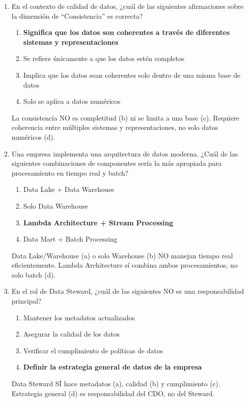 \documentclass[12pt]{article}
\begin{document}
\begin{enumerate}[label=\arabic*.]

\item En el contexto de calidad de datos, ¿cuál de las siguientes afirmaciones sobre la dimensión de ``Consistencia'' es correcta?
\begin{enumerate}
    \item \textbf{Significa que los datos son coherentes a través de diferentes sistemas y representaciones}
    \item Se refiere únicamente a que los datos estén completos
    \item Implica que los datos sean coherentes solo dentro de una misma base de datos
    \item Solo se aplica a datos numéricos
\end{enumerate}
La consistencia NO es completitud (b) ni se limita a una base (c). Requiere coherencia entre múltiples sistemas y representaciones, no solo datos numéricos (d).

\item Una empresa implementa una arquitectura de datos moderna. ¿Cuál de las siguientes combinaciones de componentes sería la más apropiada para procesamiento en tiempo real y batch?
\begin{enumerate}
    \item Data Lake + Data Warehouse
    \item Solo Data Warehouse
    \item \textbf{Lambda Architecture + Stream Processing}
    \item Data Mart + Batch Processing
\end{enumerate}
Data Lake/Warehouse (a) o solo Warehouse (b) NO manejan tiempo real eficientemente. Lambda Architecture sí combina ambos procesamientos, no solo batch (d).

\item En el rol de Data Steward, ¿cuál de las siguientes NO es una responsabilidad principal?
\begin{enumerate}
    \item Mantener los metadatos actualizados
    \item Asegurar la calidad de los datos
    \item Verificar el cumplimiento de políticas de datos
    \item \textbf{Definir la estrategia general de datos de la empresa}
\end{enumerate}
Data Steward SÍ hace metadatos (a), calidad (b) y cumplimiento (c). Estrategia general (d) es responsabilidad del CDO, no del Steward.


\end{enumerate}
\end{document}
